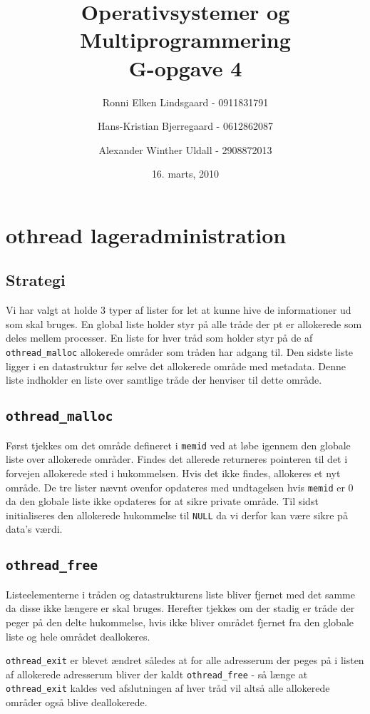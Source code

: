 \documentclass[titlepage]{article}
\title{Operativsystemer og Multiprogrammering\\G-opgave 4}
\author{Ronni Elken Lindsgaard - 0911831791 \and
Hans-Kristian Bjerregaard - 0612862087 \and
Alexander Winther Uldall - 2908872013}
\date{16. marts, 2010}
\begin{document}
\maketitle
\newpage

\section{othread lageradministration}
\subsection{Strategi}
Vi har valgt at holde 3 typer af lister for let at kunne hive de informationer ud som skal bruges.
En global liste holder styr på alle tråde der pt er allokerede som deles mellem processer. En liste
for hver tråd som holder styr på de af {\tt othread\_malloc} allokerede områder som tråden har
  adgang til. Den sidste liste ligger i en datastruktur før selve det allokerede område med
  metadata. Denne liste indholder en liste over samtlige tråde der henviser til dette område.

\subsection{\tt othread\_malloc}
Først tjekkes om det område defineret i {\tt memid} ved at løbe igennem den globale liste over
allokerede områder. Findes det allerede returneres pointeren til det i forvejen allokerede sted i
hukommelsen.
Hvis det ikke findes, allokeres et nyt område. De tre lister nævnt ovenfor opdateres med undtagelsen
hvis {\tt memid} er 0 da den globale liste ikke opdateres for at sikre private område. Til sidst
initialiseres den allokerede hukommelse til {\tt NULL} da vi derfor kan være sikre på data's værdi.

\subsection{\tt othread\_free}
Listeelementerne i tråden og datastrukturens liste bliver fjernet med det samme da disse ikke
længere er skal bruges. Herefter tjekkes om der stadig er tråde der peger på den delte hukommelse,
hvis ikke bliver området fjernet fra den globale liste og hele området deallokeres.

{\tt othread\_exit} er blevet ændret således at for alle adresserum der peges på i listen af
allokerede adresserum bliver der kaldt {\tt othread\_free} - så længe at {\tt othread\_exit} kaldes
ved afslutningen af hver tråd vil altså alle allokerede områder også blive deallokerede.
\end{document}
